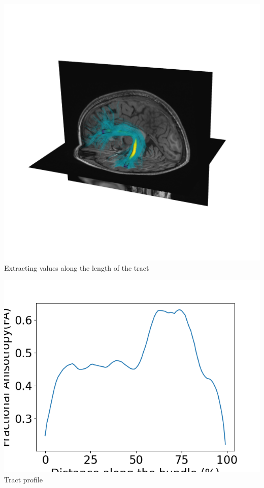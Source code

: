 \documentclass[a0paper,landscape,fontscale=0.365]{baposter}
\newenvironment{Figure}
  {\par\medskip\noindent\minipage{\linewidth}}
  {\endminipage\par\medskip}
\begin{document}
\begin{poster}
{\begin{multicols}{4}
    \columnbreak
    \begin{Figure}
        \centering
        \includegraphics[width=1.0\linewidth]{figures/arc_profile_trk}
        Extracting values along the length of the tract
    \end{Figure}
    \columnbreak
    \begin{Figure}
        \vspace{0.5cm}
        \centering
        \includegraphics[width=1.0\linewidth]{figures/tract_profile}
        Tract profile
    \end{Figure}


\end{multicols}}
\end{poster}
\end{document}
